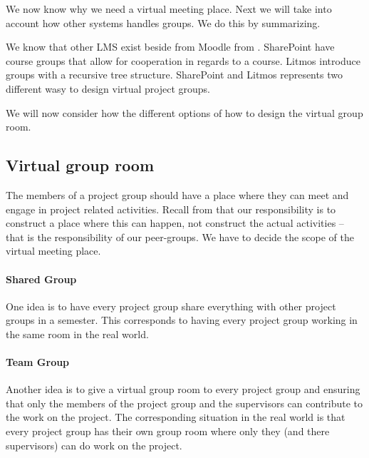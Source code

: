We now know why we need a virtual meeting place. Next we will take into account how other systems handles groups. We do this by summarizing.

We know that other LMS exist beside from Moodle from \secref{}. 
SharePoint have course groups that allow for cooperation in regards to a course. Litmos introduce groups with a recursive tree structure. SharePoint and Litmos represents two different wasy to design virtual project groups. \\




We will now consider how the different options of how to design the virtual group room.

\subsection{Virtual group room}
The members of a project group should have a place where they can meet and engage in project related activities.
Recall from  that our responsibility is to construct a place where this can happen, not construct the actual activities -- that is the responsibility of our peer-groups.
We have to decide the scope of the virtual meeting place.

\paragraph{Shared Group} One idea is to have every project group share everything with other project groups in a semester.
This corresponds to having every project group working in the same room in the real world.

\paragraph{Team Group} Another idea is to give a virtual group room to every project group and ensuring that only the members of the project group and the supervisors can contribute to the work on the project.
The corresponding situation in the real world is that every project group has their own group room where only they (and there supervisors) can do work on the project. \\

